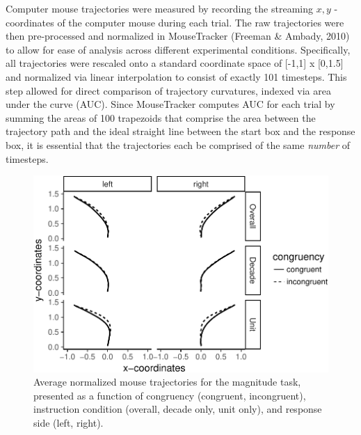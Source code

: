 \documentclass[english,man]{apa6}
\theoremstyle{definition}
\theoremstyle{definition}
\theoremstyle{definition}
\theoremstyle{remark}
\begin{document}
Computer mouse trajectories were measured by recording the streaming
\(x, y\) - coordinates of the computer mouse during each trial. The raw
trajectories were then pre-processed and normalized in MouseTracker
(Freeman \& Ambady, 2010) to allow for ease of analysis across different
experimental conditions. Specifically, all trajectories were rescaled
onto a standard coordinate space of {[}-1,1{]} x {[}0,1.5{]} and
normalized via linear interpolation to consist of exactly 101 timesteps.
This step allowed for direct comparison of trajectory curvatures,
indexed via area under the curve (AUC). Since MouseTracker computes AUC
for each trial by summing the areas of 100 trapezoids that comprise the
area between the trajectory path and the ideal straight line between the
start box and the response box, it is essential that the trajectories
each be comprised of the same \emph{number} of timesteps.

\begin{figure}
\centering
\includegraphics{paper_files/figure-latex/magnitudeTrajectories-1.pdf}
\caption{\label{fig:magnitudeTrajectories}Average normalized mouse
trajectories for the magnitude task, presented as a function of
congruency (congruent, incongruent), instruction condition (overall,
decade only, unit only), and response side (left, right).}
\end{figure}
\end{document}
